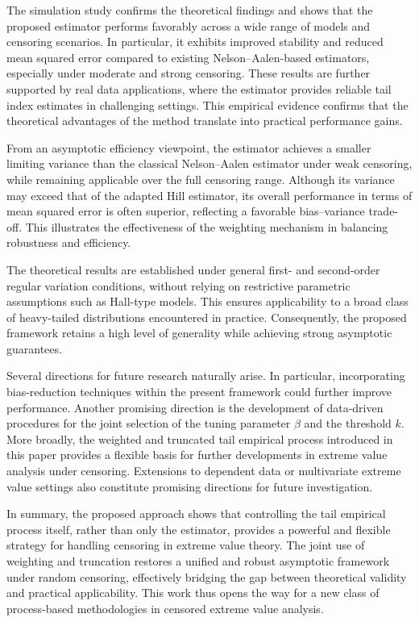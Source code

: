 \documentclass[reqno,openbib,runningheads,a4paper,12pt]{amsart}%
\begin{document}
\noindent The simulation study confirms the theoretical findings and shows
that the proposed estimator performs favorably across a wide range of models
and censoring scenarios. In particular, it exhibits improved stability and
reduced mean squared error compared to existing Nelson--Aalen-based
estimators, especially under moderate and strong censoring. These results are
further supported by real data applications, where the estimator provides
reliable tail index estimates in challenging settings. This empirical evidence
confirms that the theoretical advantages of the method translate into
practical performance gains. \smallskip

\noindent From an asymptotic efficiency viewpoint, the estimator achieves a
smaller limiting variance than the classical Nelson--Aalen estimator under
weak censoring, while remaining applicable over the full censoring range.
Although its variance may exceed that of the adapted Hill estimator, its
overall performance in terms of mean squared error is often superior,
reflecting a favorable bias--variance trade-off. This illustrates the
effectiveness of the weighting mechanism in balancing robustness and
efficiency. \smallskip

\noindent The theoretical results are established under general first- and
second-order regular variation conditions, without relying on restrictive
parametric assumptions such as Hall-type models. This ensures applicability to
a broad class of heavy-tailed distributions encountered in practice.
Consequently, the proposed framework retains a high level of generality while
achieving strong asymptotic guarantees. \smallskip

\noindent Several directions for future research naturally arise. In
particular, incorporating bias-reduction techniques within the present
framework could further improve performance. Another promising direction is
the development of data-driven procedures for the joint selection of the
tuning parameter $\beta$ and the threshold $k$. More broadly, the weighted and
truncated tail empirical process introduced in this paper provides a flexible
basis for further developments in extreme value analysis under censoring.
Extensions to dependent data or multivariate extreme value settings also
constitute promising directions for future investigation. \smallskip

\noindent In summary, the proposed approach shows that controlling the tail
empirical process itself, rather than only the estimator, provides a powerful
and flexible strategy for handling censoring in extreme value theory. The
joint use of weighting and truncation restores a unified and robust asymptotic
framework under random censoring, effectively bridging the gap between
theoretical validity and practical applicability. This work thus opens the way
for a new class of process-based methodologies in censored extreme value analysis.
\end{document}
